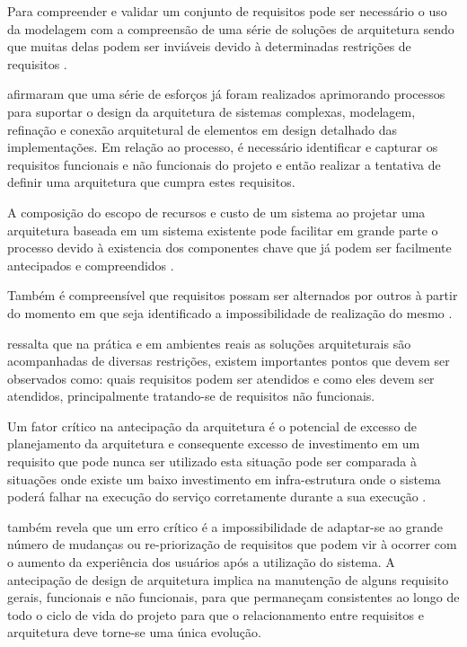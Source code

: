 Para compreender e validar um conjunto de requisitos pode ser necessário o uso da modelagem com a compreensão de uma série de soluções de arquitetura sendo que muitas delas podem ser inviáveis devido à determinadas restrições de requisitos \cite{babar2013agile}. 

\cite{hanschke2015integrating} afirmaram que uma série de esforços já foram realizados aprimorando processos para suportar o design da arquitetura de sistemas complexas, modelagem, refinação e conexão arquitetural de elementos em design detalhado das implementações.  Em relação ao processo, é necessário identificar e capturar os requisitos funcionais e não funcionais do projeto e então realizar a tentativa de definir uma arquitetura que cumpra estes requisitos.

A composição do escopo de recursos e custo de um sistema ao projetar uma arquitetura baseada em um sistema existente pode facilitar em grande parte o processo devido à existencia dos componentes chave que já podem ser facilmente antecipados e compreendidos \cite{babar2013agile}.

Também é compreensível que requisitos possam ser alternados por outros à partir do momento em que seja identificado a impossibilidade de realização do mesmo  \cite{babar2013agile}.  

\cite{hanschke2015integrating} ressalta que na prática e em ambientes reais as soluções arquiteturais são acompanhadas de diversas restrições, existem importantes pontos que devem ser observados como: quais requisitos podem ser atendidos e como eles devem ser atendidos, principalmente tratando-se de requisitos não funcionais.

Um fator crítico na antecipação da arquitetura é o potencial de excesso de planejamento da arquitetura e consequente excesso de investimento em um requisito que pode nunca ser utilizado esta situação pode ser comparada à situações onde existe um baixo investimento em infra-estrutura onde o sistema poderá falhar na execução do serviço corretamente durante a sua execução \cite{grundy2012guest}. 


\cite{beck2001manifesto} também revela que um erro crítico é a impossibilidade de adaptar-se ao grande número de mudanças ou re-priorização de requisitos que podem vir à ocorrer com o aumento da experiência dos usuários após a utilização do sistema. A antecipação de design de arquitetura implica na manutenção de alguns requisito gerais, funcionais e não funcionais, para que permaneçam consistentes ao longo de todo o ciclo de vida do projeto para que o relacionamento entre requisitos e arquitetura deve torne-se uma única evolução. 



